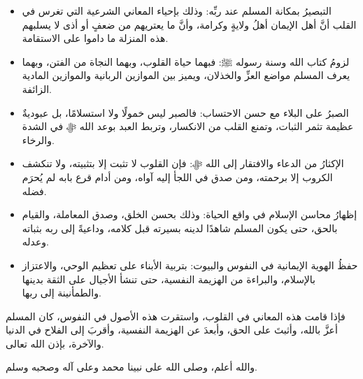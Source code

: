 \documentclass[12pt,openany]{book}
\newenvironment{bullets}
  {\begin{itemize}}
  {\end{itemize}}
\newenvironment{closingline}
  {\begin{center}\titlefont}
  {\end{center}}
\begin{document}
\begin{bullets}
\item التبصيرُ بمكانة المسلم عند ربِّه: وذلك بإحياء المعاني الشرعية التي تغرس في القلب أنَّ أهل الإيمان أهلُ ولايةٍ وكرامة، وأنَّ ما يعتريهم من ضعفٍ أو أذى لا يسلبهم هذه المنزلة ما داموا على الاستقامة.
\item لزومُ كتاب الله وسنة رسوله ﷺ: فبهما حياة القلوب، وبهما النجاة من الفتن، وبهما يعرف المسلم مواضع العزِّ والخذلان، ويميز بين الموازين الربانية والموازين المادية الزائفة.
\item الصبرُ على البلاء مع حسن الاحتساب: فالصبر ليس خمولًا ولا استسلامًا، بل عبوديةٌ عظيمة تثمر الثبات، وتمنع القلب من الانكسار، وتربط العبد بوعد الله ﷻ في الشدة والرخاء.
\item الإكثارُ من الدعاء والافتقار إلى الله ﷻ: فإن القلوب لا تثبت إلا بتثبيته، ولا تنكشف الكروب إلا برحمته، ومن صدق في اللجأ إليه آواه، ومن أدام قرع بابه لم يُحرَم فضله.
\item إظهارُ محاسن الإسلام في واقع الحياة: وذلك بحسن الخلق، وصدق المعاملة، والقيام بالحق، حتى يكون المسلم شاهدًا لدينه بسيرته قبل كلامه، وداعيةً إلى ربه بثباته وعدله.
\item حفظُ الهوية الإيمانية في النفوس والبيوت: بتربية الأبناء على تعظيم الوحي، والاعتزاز بالإسلام، والبراءة من الهزيمة النفسية، حتى تنشأ الأجيال على الثقة بدينها والطمأنينة إلى ربها.
\end{bullets}
فإذا قامت هذه المعاني في القلوب، واستقرت هذه الأصول في النفوس، كان المسلم أعزَّ بالله، وأثبتَ على الحق، وأبعدَ عن الهزيمة النفسية، وأقربَ إلى الفلاح في الدنيا والآخرة، بإذن الله تعالى.

\begin{closingline}
والله أعلم، وصلى الله على نبينا محمد وعلى آله وصحبه وسلم.
\end{closingline}
\end{document}
